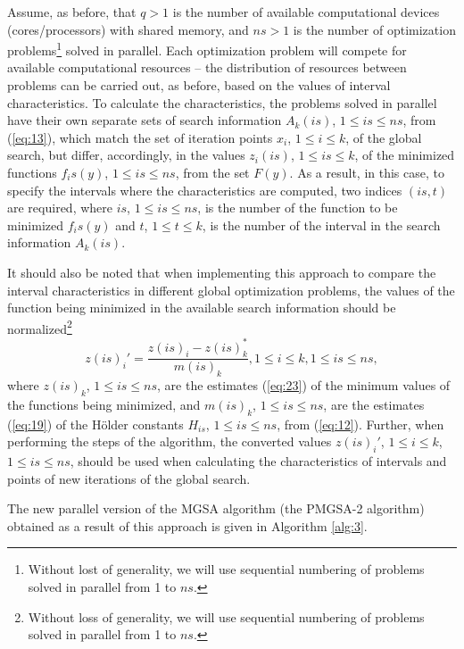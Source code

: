 \documentclass[review]{elsarticle}
\begin{document}
Assume, as before, that $q>1$ is the number of available computational devices (cores/processors) with shared memory, and $ns>1$ is the number of optimization problems\footnote{Without lost of generality, we will use sequential numbering of problems solved in parallel from 1 to $ns$.}  solved in parallel. Each optimization problem will compete for available computational resources -- the distribution of resources between problems can be carried out, as before, based on the values of interval characteristics. To calculate the characteristics, the problems solved in parallel have their own separate sets of search information $A_k (is)$, $1 \leq is \leq ns$, from (\ref{eq:13}), which match the set of iteration points $x_i$, $1 \leq i \leq k$, of the global search, but differ, accordingly, in the values $z_i (is)$, $1 \leq is \leq k$, of the minimized functions $f_is (y)$, $1 \leq is \leq ns$, from the set $F(y)$. As a result, in this case, to specify the intervals where the characteristics are computed, two indices $( is, t )$ are required, where $is$, $1 \leq is \leq ns$, is the number of the function to be minimized  $f_is (y)$ and  $t$, $1 \leq t \leq k$, is the number of the interval in the search information $A_k (is)$.

It should also be noted that when implementing this approach to compare the interval characteristics in different global optimization problems, the values of the function being minimized in the available search information should be normalized\footnote{Without loss of generality, we will use sequential numbering of problems solved in parallel from 1 to $ns$.}
\begin{equation}\label{eq:25}
z(is)_i'=\frac{z(is)_i - z(is)_k^*}{m(is)_k}, 1 \leq i \leq k,1 \leq is \leq ns,
\end{equation}
where $z(is)_k$, $1 \leq is \leq ns$, are the estimates (\ref{eq:23}) of the minimum values of the functions being minimized, and $m(is)_k$, $1 \leq is \leq ns$, are the estimates (\ref{eq:19}) of the H\"older constants $H_{is}$, $1 \leq is \leq ns$, from (\ref{eq:12}). Further, when performing the steps of the algorithm, the converted values $z(is)_i'$, $1 \leq i \leq k$, $1 \leq is \leq ns$, should be used when calculating the characteristics of intervals and points of new iterations of the global search.

The new parallel version of the MGSA algorithm (the PMGSA-2 algorithm) obtained as a result of this approach is given in Algorithm \ref{alg:3}.
\end{document}

